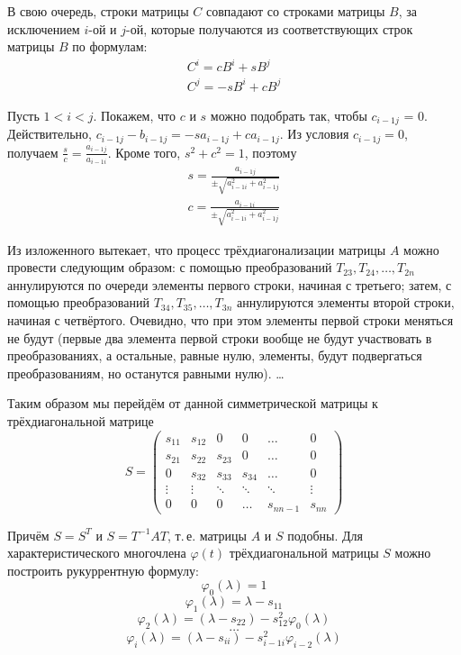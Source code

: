 \documentclass[a4paper,12pt,notitlepage,pdftex,headsepline]{scrartcl}
\begin{document}
В свою очередь, строки матрицы $C$ совпадают со строками матрицы $B$, за исключением $i$-ой и $j$-ой, которые получаются из соответствующих строк матрицы $B$ по формулам:
\begin{eqnarray}
\label{eq:c_ij_from_b_ij}
C^i = c B^i + s B^j\\
C^j = -s B^i + c B^j
\end{eqnarray}

Пусть $1 < i < j$. Покажем, что $c$ и $s$ можно подобрать так, чтобы $c_{i-1 j}$ = 0.
Действительно, $c_{i-1 j} - b_{i-1 j} = -s a_{i-1 j} + c a_{i-1 j}$.
Из условия $c_{i-1 j} = 0$, получаем $\frac{s}{c} = \frac{a_{i-1 j}}{a_{i-1 i}}$.
Кроме того, $s^2 + c^2 = 1$, поэтому
\begin{eqnarray}
\label{eq:s_and_c_eq}
s = \frac{a_{i-1 j}}{\pm\sqrt{a_{i-1 i}^2 + a_{i-1 j}^2}}\\
c = \frac{a_{i-1 i}}{\pm\sqrt{a_{i-1 i}^2 + a_{i-1 j}^2}}
\end{eqnarray}

Из изложенного вытекает, что процесс трёхдиагонализации матрицы $A$ можно провести следующим образом:
с помощью преобразований $T_{23}, T_{24}, \dots, T_{2n}$ аннулируются по очереди элементы первого строки, начиная с третьего;
затем, с помощью преобразований $T_{34}, T_{35}, \dots, T_{3n}$ аннулируются элементы второй строки, начиная с четвёртого.
Очевидно, что при этом элементы первой строки меняться не будут (первые два элемента первой строки вообще не будут участвовать в преобразованиях, а остальные, равные нулю, элементы, будут подвергаться преобразованиям, но останутся равными нулю).
\dots

Таким образом мы перейдём от данной симметрической матрицы к трёхдиагональной матрице
$$S = \left(\begin{matrix}
s_{11} & s_{12} & 0 & 0 & \hdots & 0\\
s_{21} & s_{22} & s_{23} & 0 & \hdots & 0\\
0 & s_{32} & s_{33} & s_{34} & \hdots & 0\\
\vdots & \vdots & \ddots & \ddots & \ddots & \vdots\\
0 & 0 & 0 & \hdots & s_{n n-1} & s_{nn}
\end{matrix}\right)$$

Причём $S = S^T$ и $S = T^{-1} A T$, т.\,е. матрицы $A$ и $S$ подобны.
Для характеристического многочлена $\varphi\left(t\right)$ трёхдиагональной матрицы $S$ можно построить рукуррентную формулу:
$$\varphi_0\left(\lambda\right) = 1$$
$$\varphi_1\left(\lambda\right) = \lambda - s_{11}$$
$$\varphi_2\left(\lambda\right) = \left(\lambda - s_{22}\right) - s_{12}^2\varphi_0\left(\lambda\right)$$
$$\dots$$
$$\varphi_i\left(\lambda\right) = \left(\lambda - s_{ii}\right) - s_{i-1 i}^2\varphi_{i - 2}\left(\lambda\right)$$
\end{document}

